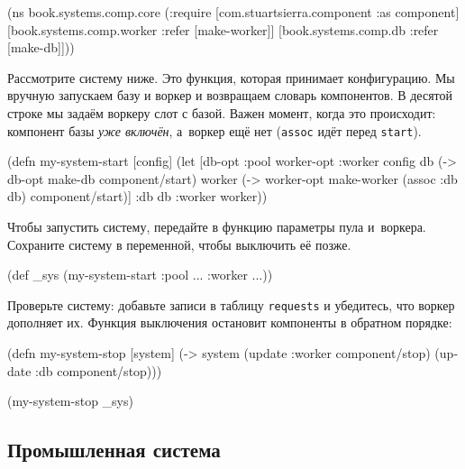 \begin{english}
  \begin{clojure}
(ns book.systems.comp.core
  (:require
   [com.stuartsierra.component :as component]
   [book.systems.comp.worker :refer [make-worker]]
   [book.systems.comp.db :refer [make-db]]))
  \end{clojure}
\end{english}

Рассмотрите систему ниже. Это функция, которая принимает конфигурацию. Мы
вручную запускаем базу и воркер и возвращаем словарь компонентов. В десятой
строке мы задаём воркеру слот с базой. Важен момент, когда это происходит:
компонент базы \emph{уже включён}, а~воркер ещё нет (\verb|assoc| идёт перед
\verb|start|).

\begin{english}
  \begin{clojure/lines}
(defn my-system-start
  [config]
  (let [{db-opt :pool
         worker-opt :worker} config
        db (-> db-opt
               make-db
               component/start)
        worker (-> worker-opt
                   make-worker
                   (assoc :db db)
                   component/start)]
    {:db db :worker worker}))
  \end{clojure/lines}
\end{english}

Чтобы запустить систему, передайте в функцию параметры пула и~воркера. Сохраните
систему в переменной, чтобы выключить её позже.

\begin{english}
  \begin{clojure}
(def _sys (my-system-start {:pool {...} :worker {...}}))
  \end{clojure}
\end{english}

Проверьте систему: добавьте записи в таблицу \verb|requests| и убедитесь, что
воркер дополняет их. Функция выключения остановит компоненты в обратном порядке:

\begin{english}
  \begin{clojure}
(defn my-system-stop
  [system]
  (-> system
      (update :worker component/stop)
      (update :db component/stop)))

(my-system-stop _sys)
  \end{clojure}
\end{english}

\subsection{Промышленная система}

